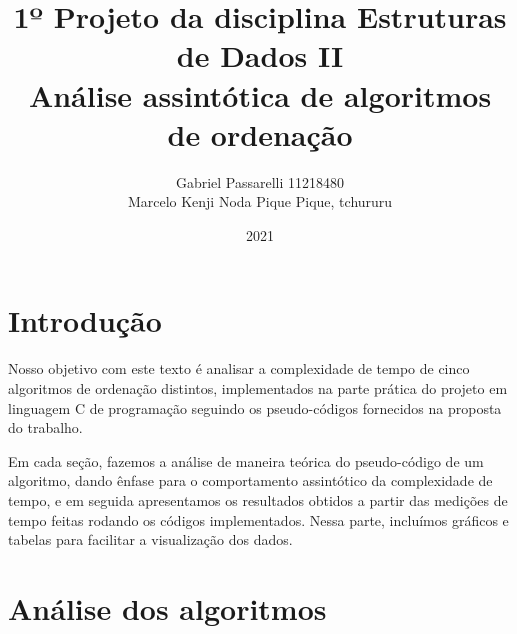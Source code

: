 \documentclass{article}
\title{%
    1º Projeto da disciplina Estruturas de Dados II \\
     \large Análise assintótica de algoritmos de ordenação}
\author{Gabriel Passarelli 11218480\\ Marcelo Kenji Noda Pique Pique, tchururu}
\date{2021}
\begin{document}
%
\maketitle
%
\newpage
\section{Introdução}
Nosso objetivo com este texto é analisar a complexidade de tempo de cinco algoritmos de ordenação distintos, implementados na parte prática do projeto em linguagem C de programação seguindo os pseudo-códigos fornecidos na proposta do trabalho.\par
%
Em cada seção, fazemos a análise de maneira teórica do pseudo-código de um algoritmo, dando ênfase para o comportamento assintótico da complexidade de tempo, e em seguida apresentamos os resultados obtidos a partir das medições de tempo feitas rodando os códigos implementados. Nessa parte, incluímos gráficos e tabelas para facilitar a visualização dos dados.
%
\section{Análise dos algoritmos}
\end{document}
